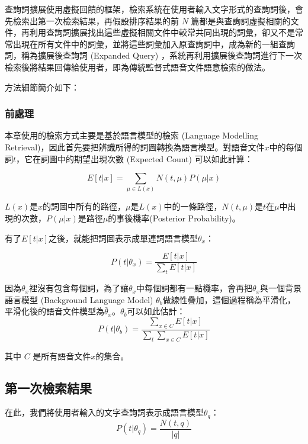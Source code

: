 查詢詞擴展使用虛擬回饋的框架，檢索系統在使用者輸入文字形式的查詢詞後，會先檢索出第一次檢索結果，再假設排序結果的前 $N$ 篇都是與查詢詞虛擬相關的文件，再利用查詢詞擴展找出這些虛擬相關文件中較常共同出現的詞彙，卻又不是常常出現在所有文件中的詞彙，並將這些詞彙加入原查詢詞中，成為新的一組查詢詞，稱為擴展後查詢詞 (Expanded Query) ，系統再利用擴展後查詢詞進行下一次檢索後將結果回傳給使用者，即為傳統監督式語音文件語意檢索的做法。

方法細節簡介如下：

\subsubsection{前處理}
\label{sec:preprocessing}
本章使用的檢索方式主要是基於語言模型的檢索 (Language Modelling Retrieval)，因此首先要把辨識所得的詞圖轉換為語言模型。對語音文件$x$中的每個詞$t$，它在詞圖中的期望出現次數 (Expected Count) 可以如此計算：

\begin{equation}
E[t|x] = \sum_{\mu \in L(x)} N(t, \mu)P(\mu|x)
\end{equation}

$L(x)$是$x$的詞圖中所有的路徑，$\mu$是$L(x)$中的一條路徑，$N(t, \mu)$是$t$在$\mu$中出現的次數，$P(\mu|x)$是路徑$\mu$的事後機率(Posterior Probability)。

有了$E[t|x]$之後，就能把詞圖表示成單連詞語言模型$\theta_x$：

\begin{equation}
P(t|\theta_x) = \frac{E[t|x]}{\sum_tE[t|x]}
\end{equation}

因為$\theta_x$裡沒有包含每個詞，為了讓$\theta_x$中每個詞都有一點機率，會再把$\theta_x$與一個背景語言模型 (Background Language Model) $\theta_b$做線性疊加，這個過程稱為平滑化，平滑化後的語音文件模型為$\bar{\theta}_x$。$\theta_b$可以如此估計：
\begin{equation}
\label{equ:chap3_bgm}
P(t|\theta_b) = \frac{\sum_{x\in C}E[t|x]}{\sum_t\sum_{x\in C}E[t|x]}
\end{equation}

其中 $C$ 是所有語音文件$x$的集合。

\subsection{第一次檢索結果}
\label{sec:chap3_fpr}
在此，我們將使用者輸入的文字查詢詞表示成語言模型$\theta_q$：
\begin{equation}
P(t|\theta_q) = \frac{N(t, q)}{|q|}
\end{equation}

